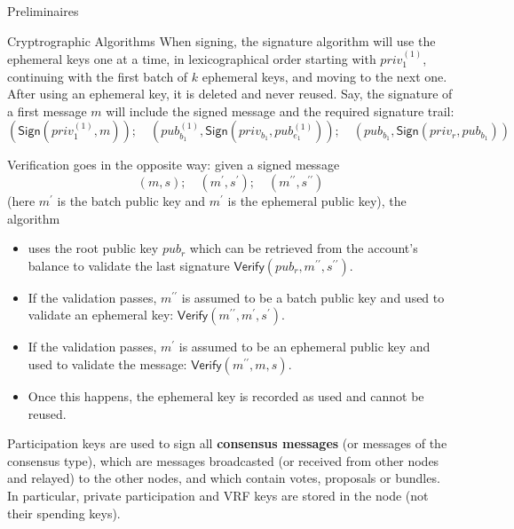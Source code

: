\documentclass[10pt,a4paper]{article}
\begin{document}
\begin{section}{Preliminaires}
\begin{subsection}{Cryptrographic Algorithms}
    When signing, the signature algorithm will use the ephemeral keys one at a time, in lexicographical 
    order starting with $priv_1^{(1)}$, continuing with the first batch of $k$ ephemeral keys, and 
    moving to the next one. After using an ephemeral key, it is deleted and never reused. 
    Say, the signature of a first message $m$ will include the signed
    message and the required signature trail:
    $$ 
        \left(\mathsf{Sign}(priv^{(1)}_1,m)\right);\quad
        \left(pub_{b_1}^{(1)}, \mathsf{Sign}(priv_{b_1},pub_{e_1}^{(1)})\right);\quad 
        \left(pub_{b_1},\mathsf{Sign}(priv_r,pub_{b_1})\right)
    $$

    Verification goes in the opposite way: given a signed message 
        $$
            (m,s);\quad
            (m^\prime, s^\prime);\quad 
            (m^{\prime\prime},s^{\prime\prime})
        $$
    (here $m^\prime$ is the batch public key and $m^\prime$ is the ephemeral public key), 
    the algorithm 
    \begin{itemize}
        \item uses the root public key $pub_r$ which can be retrieved from the account's balance to 
    validate the last signature
        $\mathsf{Verify}(
            pub_r,
            m^{\prime\prime},
            s^{\prime\prime}
            ).
        $
    \item If the validation passes, $m^{\prime\prime}$ is assumed to be a batch public key and used
        to validate an ephemeral key:
        $\mathsf{Verify}(
            m^{\prime\prime},
            m^\prime,
            s^\prime 
        ).
        $
        \item If the validation passes, $m^\prime$ is assumed to be an ephemeral public key and used
        to validate the message:
        $\mathsf{Verify}(
            m^{\prime\prime},
            m,
            s 
        ).
        $
        \item Once this happens, the ephemeral key is recorded as used and cannot be reused.
    \end{itemize}
    
    
    Participation keys are used to sign all {\bf consensus messages} (or messages of the consensus type),
    which are messages broadcasted (or received from other nodes and relayed) to the other nodes, and which 
    contain votes, proposals or bundles.
    In particular, private participation and VRF keys are stored in the node (not their spending keys).
    

\end{subsection}
\end{section}
\end{document}
